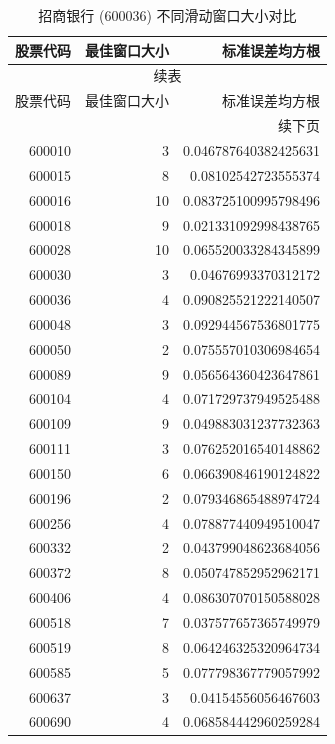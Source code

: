 \begin{center}
  \begin{longtable}{rrr}
    \caption{招商银行 (600036) 不同滑动窗口大小对比}
    \label{sliding_window:3} \\
    \toprule
    股票代码 & 最佳窗口大小 & 标准误差均方根 \\
    \midrule
    \endfirsthead
    \multicolumn{3}{c}{续表} \\
    \toprule
    股票代码 & 最佳窗口大小 & 标准误差均方根 \\
    \hline
    \endhead
    \hline
    \multicolumn{3}{r}{续下页}
    \endfoot
    \endlastfoot
    600000 & 4 & 0.06507378279547231 \\
    600010 & 3 & 0.046787640382425631 \\
    600015 & 8 & 0.08102542723555374 \\
    600016 & 10 & 0.083725100995798496 \\
    600018 & 9 & 0.021331092998438765 \\
    600028 & 10 & 0.065520033284345899 \\
    600030 & 3 & 0.04676993370312172 \\
    600036 & 4 & 0.090825521222140507 \\
    600048 & 3 & 0.092944567536801775 \\
    600050 & 2 & 0.075557010306984654 \\
    600089 & 9 & 0.056564360423647861 \\
    600104 & 4 & 0.071729737949525488 \\
    600109 & 9 & 0.049883031237732363 \\
    600111 & 3 & 0.076252016540148862 \\
    600150 & 6 & 0.066390846190124822 \\
    600196 & 2 & 0.079346865488974724 \\
    600256 & 4 & 0.078877440949510047 \\
    600332 & 2 & 0.043799048623684056 \\
    600372 & 8 & 0.050747852952962171 \\
    600406 & 4 & 0.086307070150588028 \\
    600518 & 7 & 0.037577657365749979 \\
    600519 & 8 & 0.064246325320964734 \\
    600585 & 5 & 0.077798367779057992 \\
    600637 & 3 & 0.04154556056467603 \\
    600690 & 4 & 0.068584442960259284 \\

\end{longtable}
\end{center}
